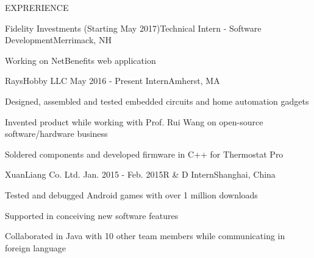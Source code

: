 \documentclass{resume} %
\begin{document}
	\begin{rSection}{EXPRERIENCE}
			
		\begin{rSubsection}{Fidelity Investments} {(Starting May 2017)}{Technical Intern - Software Development}{Merrimack, NH}
			\item Working on NetBenefits web application
		\end{rSubsection}
	
		\begin{rSubsection}{RaysHobby LLC} {May 2016 - Present}{ Intern}{Amherst, MA}
			\item Designed, assembled and tested embedded circuits and home automation gadgets
			\item Invented product while working with Prof. Rui Wang on open-source software/hardware business
			\item Soldered components and developed firmware in C++ for Thermostat Pro
		\end{rSubsection}
	
		\begin{rSubsection}{XuanLiang Co. Ltd.} {Jan. 2015 - Feb. 2015}{R \& D  Intern}{Shanghai, China}
			\item Tested and debugged Android games with over 1 million downloads
			\item Supported in conceiving new software features
			\item Collaborated in Java with 10 other team members while communicating in foreign language
		\end{rSubsection}
	
	\end{rSection}
	
	
\end{document}
